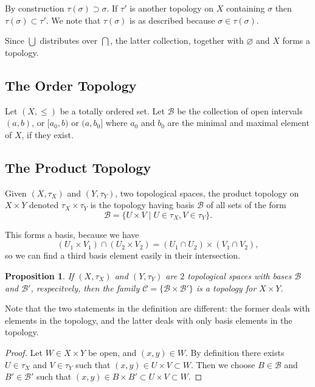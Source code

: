 \documentclass[12pt]{article}
\theoremstyle{plain}
\newtheorem{proposition}{Proposition}
\theoremstyle{definition}
\begin{document}
By construction $\tau(\sigma) \supset \sigma$. If $\tau'$ is another topology on $X$ containing $\sigma$ then $\tau(\sigma) \subset \tau'$. We note that $\tau(\sigma)$ is as described because $\sigma \in \tau(\sigma)$.

Since $\bigcup$ distributes over $\bigcap$, the latter collection, together with $\varnothing$ and $X$ forms a topology.

\subsection{The Order Topology}

Let $(X, \leq)$ be a totally ordered set. Let $\mathcal{B}$ be the collection of open intervals $(a, b)$, or $[a_0,b)$ or $(a, b_0]$ where $a_0$ and $b_0$ are the minimal and maximal element of $X$, if they exist.

\subsection{The Product Topology}

Given $(X, \tau_X)$ and $(Y, \tau_Y)$, two topological spaces, the product topology on $X \times Y$ denoted $\tau_X \times \tau_Y$ is the topology having basis $\mathcal{B}$ of all sets of the form
\[\mathcal{B} = \{U \times V \mid U \in \tau_X, V \in \tau_Y\}.\]

This forms a basis, because we have
\[(U_1 \times V_1) \cap (U_2 \times V_2) = (U_1 \cap U_2) \times (V_1 \cap V_2),\] so we can find a third basis element easily in their intersection.

\begin{proposition}
If $(X, \tau_X)$ and $(Y, \tau_Y)$ are $2$ topological spaces with bases $\mathcal{B}$ and $\mathcal{B}'$, respecitvely, then the family $\mathcal{C} = \{\mathcal{B} \times \mathcal{B}'\}$ is a topology for $X \times Y$. 
\end{proposition}

Note that the two statements in the definition are different: the former deals with elements in the topology, and the latter deals with only basis elements in the topology. 

\begin{proof}
Let $W \in X \times Y$ be open, and $(x, y) \in W$. By definition there exists $U \in \tau_X$ and $V \in \tau_Y$ such that $(x, y) \in U \times V \subset W$. Then we choose $B \in \mathcal{B}$ and $B' \in \mathcal{B}'$ such that $(x, y) \in B \times B' \subset U \times V \subset W$.
\end{proof}
\end{document}
